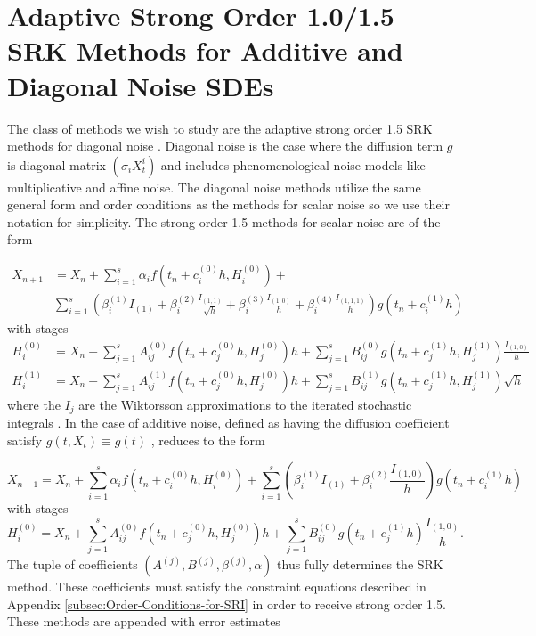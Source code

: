 \documentclass{article}
\begin{document}
\section{Adaptive Strong Order 1.0/1.5 SRK Methods for Additive and Diagonal
	Noise SDEs}

The class of methods we wish to study are the adaptive strong order
1.5 SRK methods for diagonal noise \cite{RN2707,RN3787}. Diagonal
noise is the case where the diffusion term $g$ is diagonal matrix
$\left(\sigma_{i}X_{t}^{i}\right)$ and includes phenomenological
noise models like multiplicative and affine noise. The diagonal noise
methods utilize the same general form and order conditions as the
methods for scalar noise so we use their notation for simplicity.
The strong order 1.5 methods for scalar noise are of the form

\begin{align}
X_{n+1} & =X_{n}+\sum_{i=1}^{s}\alpha_{i}f\left(t_{n}+c_{i}^{(0)}h,H_{i}^{(0)}\right)+\\
        & \sum_{i=1}^{s}\left(\beta_{i}^{(1)}I_{(1)}+\beta_{i}^{(2)}\frac{I_{(1,1)}}{\sqrt{h}}+\beta_{i}^{(3)}\frac{I_{(1,0)}}{h}+\beta_{i}^{(4)}\frac{I_{(1,1,1)}}{h}\right)g\left(t_{n}+c_{i}^{(1)}h\right)\label{eq:update}
\end{align}
with stages
\begin{align}
H_{i}^{(0)} & =X_{n}+\sum_{j=1}^{s}A_{ij}^{(0)}f\left(t_{n}+c_{j}^{(0)}h,H_{j}^{(0)}\right)h+\sum_{j=1}^{s}B_{ij}^{(0)}g\left(t_{n}+c_{j}^{(1)}h,H_{j}^{(1)}\right)\frac{I_{(1,0)}}{h}\label{eq:stages}\\
H_{i}^{(1)} & =X_{n}+\sum_{j=1}^{s}A_{ij}^{(1)}f\left(t_{n}+c_{j}^{(0)}h,H_{j}^{(0)}\right)h+\sum_{j=1}^{s}B_{ij}^{(1)}g\left(t_{n}+c_{j}^{(1)}h,H_{j}^{(1)}\right)\sqrt{h}\nonumber
\end{align}
where the $I_{j}$ are the Wiktorsson approximations to the iterated
stochastic integrals \cite{RN3175}. In the case of additive noise,
defined as having the diffusion coefficient satisfy $g(t,X_{t})\equiv g(t)$
, reduces to the form

\begin{equation}
X_{n+1}=X_{n}+\sum_{i=1}^{s}\alpha_{i}f\left(t_{n}+c_{i}^{(0)}h,H_{i}^{(0)}\right)+\sum_{i=1}^{s}\left(\beta_{i}^{(1)}I_{(1)}+\beta_{i}^{(2)}\frac{I_{(1,0)}}{h}\right)g\left(t_{n}+c_{i}^{(1)}h\right)\label{eq:add_update}
\end{equation}
with stages
\begin{equation}
H_{i}^{(0)}=X_{n}+\sum_{j=1}^{s}A_{ij}^{(0)}f\left(t_{n}+c_{j}^{(0)}h,H_{j}^{(0)}\right)h+\sum_{j=1}^{s}B_{ij}^{(0)}g\left(t_{n}+c_{j}^{(1)}h\right)\frac{I_{(1,0)}}{h}.\label{eq:add_stages}
\end{equation}
The tuple of coefficients $\left(A^{(j)},B^{(j)},\beta^{(j)},\alpha\right)$
thus fully determines the SRK method. These coefficients must satisfy
the constraint equations described in Appendix \ref{subsec:Order-Conditions-for-SRI}
in order to receive strong order 1.5. These methods are appended with
error estimates
\end{document}

